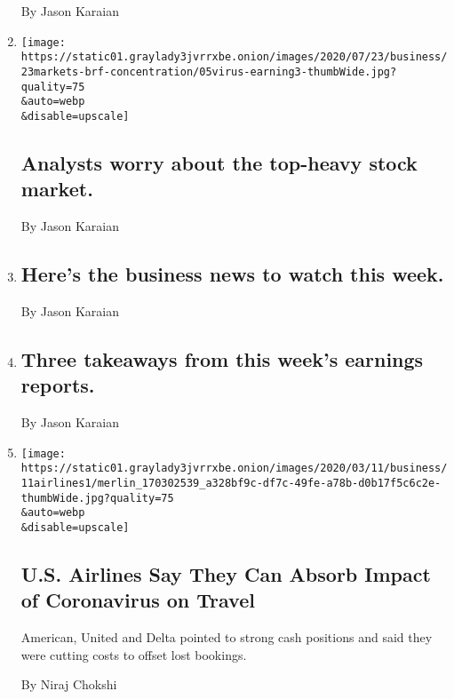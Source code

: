 \begin{enumerate}
  By Jason Karaian
\item
  \href{/2020/07/23/business/analysts-worry-about-the-top-heavy-stock-market.html}{}

  \texttt{[image: https://static01.graylady3jvrrxbe.onion/images/2020/07/23/business/23markets-brf-concentration/05virus-earning3-thumbWide.jpg?quality=75\\\&auto=webp\\\&disable=upscale]}

  \hypertarget{analysts-worry-about-the-top-heavy-stock-market}{%
  \subsection{Analysts worry about the top-heavy stock
  market.}\label{analysts-worry-about-the-top-heavy-stock-market}}

  By Jason Karaian
\item
  \href{/2020/07/20/business/heres-the-business-news-to-watch-this-week.html}{}

  \hypertarget{heres-the-business-news-to-watch-this-week-1}{%
  \subsection{Here's the business news to watch this
  week.}\label{heres-the-business-news-to-watch-this-week-1}}

  By Jason Karaian
\item
  \href{/2020/07/17/business/three-takeaways-from-this-weeks-earnings-reports.html}{}

  \hypertarget{three-takeaways-from-this-weeks-earnings-reports}{%
  \subsection{Three takeaways from this week's earnings
  reports.}\label{three-takeaways-from-this-weeks-earnings-reports}}

  By Jason Karaian
\item
  \href{/2020/03/10/business/airlines-coronavirus.html}{}

  \texttt{[image: https://static01.graylady3jvrrxbe.onion/images/2020/03/11/business/11airlines1/merlin\_170302539\_a328bf9c-df7c-49fe-a78b-d0b17f5c6c2e-thumbWide.jpg?quality=75\\\&auto=webp\\\&disable=upscale]}

  \hypertarget{us-airlines-say-they-can-absorb-impact-of-coronavirus-on-travel}{%
  \subsection{U.S. Airlines Say They Can Absorb Impact of Coronavirus on
  Travel}\label{us-airlines-say-they-can-absorb-impact-of-coronavirus-on-travel}}

  American, United and Delta pointed to strong cash positions and said
  they were cutting costs to offset lost bookings.

  By Niraj Chokshi
\end{enumerate}

